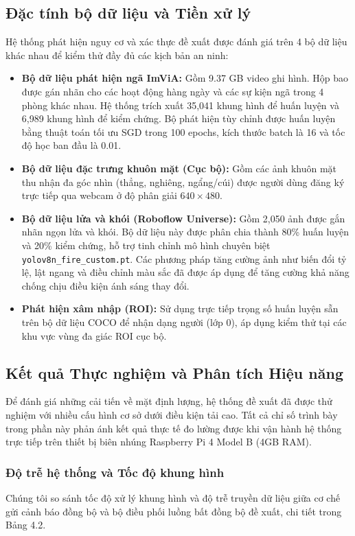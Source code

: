\documentclass[12pt,a4paper]{article}
\begin{document}
\subsection{Đặc tính bộ dữ liệu và Tiền xử lý}
Hệ thống phát hiện nguy cơ và xác thực đề xuất được đánh giá trên 4 bộ dữ liệu khác nhau để kiểm thử đầy đủ các kịch bản an ninh:
\begin{itemize}
    \item \textbf{Bộ dữ liệu phát hiện ngã ImViA:} Gồm 9.37 GB video ghi hình. Hộp bao được gán nhãn cho các hoạt động hàng ngày và các sự kiện ngã trong 4 phòng khác nhau. Hệ thống trích xuất 35,041 khung hình để huấn luyện và 6,989 khung hình để kiểm chứng. Bộ phát hiện tùy chỉnh được huấn luyện bằng thuật toán tối ưu SGD trong 100 epochs, kích thước batch là 16 và tốc độ học ban đầu là 0.01.
    \item \textbf{Bộ dữ liệu đặc trưng khuôn mặt (Cục bộ):} Gồm các ảnh khuôn mặt thu nhận đa góc nhìn (thẳng, nghiêng, ngẩng/cúi) được người dùng đăng ký trực tiếp qua webcam ở độ phân giải $640 \times 480$.
    \item \textbf{Bộ dữ liệu lửa và khói (Roboflow Universe):} Gồm 2,050 ảnh được gắn nhãn ngọn lửa và khói. Bộ dữ liệu này được phân chia thành 80\% huấn luyện và 20\% kiểm chứng, hỗ trợ tinh chỉnh mô hình chuyên biệt \texttt{yolov8n\_fire\_custom.pt}. Các phương pháp tăng cường ảnh như biến đổi tỷ lệ, lật ngang và điều chỉnh màu sắc đã được áp dụng để tăng cường khả năng chống chịu điều kiện ánh sáng thay đổi.
    \item \textbf{Phát hiện xâm nhập (ROI):} Sử dụng trực tiếp trọng số huấn luyện sẵn trên bộ dữ liệu COCO để nhận dạng người (lớp 0), áp dụng kiểm thử tại các khu vực vùng đa giác ROI cục bộ.
\end{itemize}

\subsection{Kết quả Thực nghiệm và Phân tích Hiệu năng}
Để đánh giá những cải tiến về mặt định lượng, hệ thống đề xuất đã được thử nghiệm với nhiều cấu hình cơ sở dưới điều kiện tải cao. Tất cả chỉ số trình bày trong phần này phản ánh kết quả thực tế đo lường được khi vận hành hệ thống trực tiếp trên thiết bị biên nhúng Raspberry Pi 4 Model B (4GB RAM).

\subsubsection*{Độ trễ hệ thống và Tốc độ khung hình}
Chúng tôi so sánh tốc độ xử lý khung hình và độ trễ truyền dữ liệu giữa cơ chế gửi cảnh báo đồng bộ và bộ điều phối luồng bất đồng bộ đề xuất, chi tiết trong Bảng 4.2.
\end{document}
